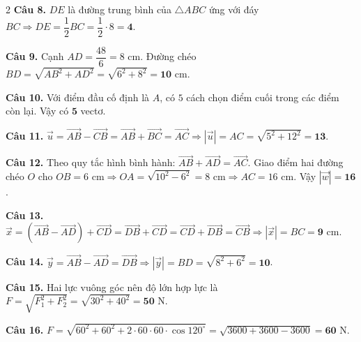 \documentclass[12pt,a4paper]{article}
\begin{document}
\begin{multicols}{2}
\textbf{Câu 8.} $DE$ là đường trung bình của $\triangle ABC$ ứng với đáy $BC \Rightarrow DE = \dfrac{1}{2}BC = \dfrac{1}{2}\cdot 8 = \mathbf{4}$.\par\vspace{2.5pt}

\textbf{Câu 9.} Cạnh $AD = \dfrac{48}{6} = 8\text{ cm}$. Đường chéo $BD = \sqrt{AB^2 + AD^2} = \sqrt{6^2 + 8^2} = \mathbf{10}\text{ cm}$.\par\vspace{2.5pt}

\textbf{Câu 10.} Với điểm đầu cố định là $A$, có $5$ cách chọn điểm cuối trong các điểm còn lại. Vậy có $\mathbf{5}$ vectơ.\par\vspace{2.5pt}

\textbf{Câu 11.} $\vec{u} = \vec{AB} - \vec{CB} = \vec{AB} + \vec{BC} = \vec{AC} \Rightarrow |\vec{u}| = AC = \sqrt{5^2 + 12^2} = \mathbf{13}$.\par\vspace{2.5pt}

\textbf{Câu 12.} Theo quy tắc hình bình hành: $\vec{AB} + \vec{AD} = \vec{AC}$. Giao điểm hai đường chéo $O$ cho $OB = 6\text{ cm} \Rightarrow OA = \sqrt{10^2 - 6^2} = 8\text{ cm} \Rightarrow AC = 16\text{ cm}$. Vậy $|\vec{w}| = \mathbf{16}$.\par\vspace{2.5pt}

\textbf{Câu 13.} $\vec{x} = (\vec{AB} - \vec{AD}) + \vec{CD} = \vec{DB} + \vec{CD} = \vec{CD} + \vec{DB} = \vec{CB} \Rightarrow |\vec{x}| = BC = \mathbf{9}\text{ cm}$.\par\vspace{2.5pt}

\textbf{Câu 14.} $\vec{y} = \vec{AB} - \vec{AD} = \vec{DB} \Rightarrow |\vec{y}| = BD = \sqrt{8^2 + 6^2} = \mathbf{10}$.\par\vspace{2.5pt}

\textbf{Câu 15.} Hai lực vuông góc nên độ lớn hợp lực là $F = \sqrt{F_1^2 + F_2^2} = \sqrt{30^2 + 40^2} = \mathbf{50}\text{ N}$.\par\vspace{2.5pt}

\textbf{Câu 16.} $F = \sqrt{60^2 + 60^2 + 2\cdot 60\cdot 60\cdot \cos 120^\circ} = \sqrt{3600 + 3600 - 3600} = \mathbf{60}\text{ N}$.\par\vspace{2.5pt}


\end{multicols}
\end{document}
